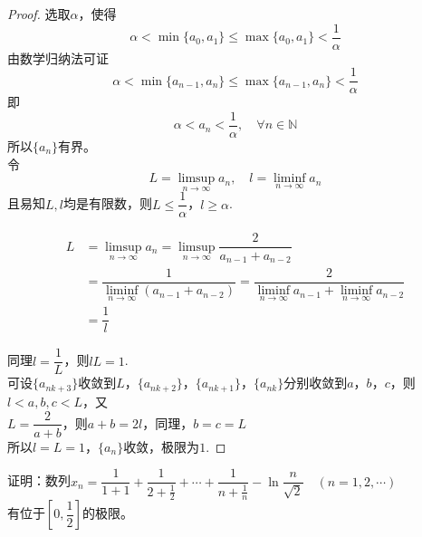 \begin{proof}

    选取$\alpha$，使得
    \[\alpha < \min\{a_0, a_1\} \leq \max\{a_0, a_1\} < \dfrac{1}{\alpha}\]
    由数学归纳法可证
    \[\alpha < \min\{a_{n - 1}, a_n\} \leq \max\{a_{n - 1}, a_n\} < \dfrac{1}{\alpha}\]
    即
    \[\alpha < a_n < \dfrac{1}{\alpha}, \quad \forall n \in \mathbb{N}\]
    所以$\{a_n\}$有界。\\
    令
    \[L = \limsup_{n \to \infty}{a_n}, \quad l = \liminf_{n \to \infty}{a_n}\]
    且易知$L, l$均是有限数，则$L \leq \dfrac{1}{\alpha}$，$l \geq \alpha$.

    \begin{align*}
        L & = \limsup_{n \to \infty}{a_n} = \limsup_{n \to \infty}{\dfrac{2}{a_{n - 1} + a_{n - 2}}} \\
         & = \dfrac{1}{\liminf\limits_{n \to \infty}{(a_{n - 1} + a_{n - 2})}} = \dfrac{2}{\liminf\limits_{n \to \infty}{a_{n - 1}} + \liminf\limits_{n \to \infty}{a_{n - 2}}} \\ 
         & = \dfrac{1}{l}
    \end{align*}

    同理$l = \dfrac{1}{L}$，则$lL = 1$. \\
    可设$\{a_{nk + 3}\}$收敛到$L$，$\{a_{nk + 2}\}$，$\{a_{nk + 1}\}$，$\{a_{nk}\}$分别收敛到$a$，$b$，$c$，则$l < a, b, c < L$，又 \\
    $L = \dfrac{2}{a + b} $，则$a + b = 2l $，同理，$b = c = L$ \\
    所以$l = L = 1$，$\{a_n\}$收敛，极限为$1$.

\end{proof}

\begin{proposition}

    证明：数列$x_n = \dfrac{1}{1 + 1} + \dfrac{1}{2 + \frac{1}{2}} + \cdots + \dfrac{1}{n + \frac{1}{n}} - \ln{\dfrac{n}{\sqrt{2}}} \quad (n = 1, 2, \cdots)$ \\
    有位于$\left[ 0, \dfrac{1}{2} \right]$的极限。
    
\end{proposition}

